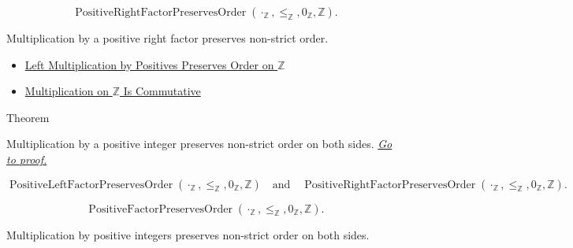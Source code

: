 \begin{remark*}
\[
\operatorname{PositiveRightFactorPreservesOrder}(\cdot_{\mathbb{Z}},\le_{\mathbb{Z}},0_{\mathbb{Z}},\mathbb{Z}).
\]
\end{remark*}

\begin{remark*}[Interpretation]
Multiplication by a positive right factor preserves non-strict order.
\end{remark*}

\begin{dependencies}
\begin{itemize}
  \item \hyperref[thm:left-positive-multiplication-preserves-order-on-z]{Left Multiplication by Positives Preserves Order on $\mathbb{Z}$}
  \item \hyperref[thm:multiplication-on-z-commutative]{Multiplication on $\mathbb{Z}$ Is Commutative}
\end{itemize}
\end{dependencies}

\begin{theorembox}{Theorem}
\begin{theorem}
\label{thm:positive-multiplication-preserves-order-on-z}
Multiplication by a positive integer preserves non-strict order on both sides.
\hyperref[prf:positive-multiplication-preserves-order-on-z]{\textit{Go to proof.}}
\end{theorem}
\end{theorembox}

\begin{remark*}
\[
\operatorname{PositiveLeftFactorPreservesOrder}(\cdot_{\mathbb{Z}},\le_{\mathbb{Z}},0_{\mathbb{Z}},\mathbb{Z})
\quad\text{and}\quad
\operatorname{PositiveRightFactorPreservesOrder}(\cdot_{\mathbb{Z}},\le_{\mathbb{Z}},0_{\mathbb{Z}},\mathbb{Z}).
\]
\end{remark*}

\begin{remark*}
\[
\operatorname{PositiveFactorPreservesOrder}(\cdot_{\mathbb{Z}},\le_{\mathbb{Z}},0_{\mathbb{Z}},\mathbb{Z}).
\]
\end{remark*}

\begin{remark*}[Interpretation]
Multiplication by positive integers preserves non-strict order on both sides.
\end{remark*}


